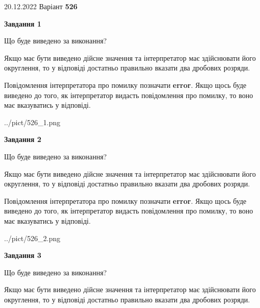 \documentclass[12pt, ukrainian]{article}
\begin{document}
{20.12.2022 Варіант \No \textbf { 526 }\par}
{
\begin {Large}

{\begin {center}\textbf{Завдання 1}\end {center}}\par
Що буде виведено за виконання? \par

Якщо має бути виведено дійсне значення та інтерпретатор має здійснювати його округлення, 
то у відповіді достатньо правильно вказати два дробових розряди.

Повідомлення інтерпретатора про помилку позначати \textbf{error}.
Якщо щось буде виведено до того, як інтерпретатор видасть повідомлення про помилку, 
то воно має вказуватись у відповіді. \par

\begin{center}
	{../pict/526_1.png}
\end{center}
\newpage

{\begin {center}\textbf{Завдання 2}\end {center}}\par
Що буде виведено за виконання? \par

Якщо має бути виведено дійсне значення та інтерпретатор має здійснювати його округлення, 
то у відповіді достатньо правильно вказати два дробових розряди.

Повідомлення інтерпретатора про помилку позначати \textbf{error}.
Якщо щось буде виведено до того, як інтерпретатор видасть повідомлення про помилку, 
то воно має вказуватись у відповіді. \par

\begin{center}
	{../pict/526_2.png}
\end{center}
\newpage

{\begin {center}\textbf{Завдання 3}\end {center}}\par
Що буде виведено за виконання? \par

Якщо має бути виведено дійсне значення та інтерпретатор має здійснювати його округлення, 
то у відповіді достатньо правильно вказати два дробових розряди.


\end{Large}}
\end{document}
